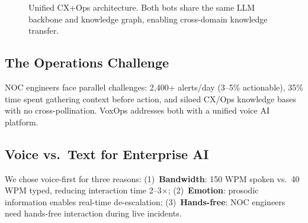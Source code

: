 \documentclass[conference,10pt]{IEEEtran}
\begin{document}
\begin{figure}[!t]
\centering
{}
\caption{Unified CX+Ops architecture. Both bots share the same LLM backbone and knowledge graph, enabling cross-domain knowledge transfer.}
\label{fig:unified}
\end{figure}

\subsection{The Operations Challenge}

NOC engineers face parallel challenges: 2,400+ alerts/day (3--5\% actionable), 35\% time spent gathering context before action, and siloed CX/Ops knowledge bases with no cross-pollination. VoxOps addresses both with a unified voice AI platform.

\subsection{Voice vs.\ Text for Enterprise AI}

We chose voice-first for three reasons: (1)~\textbf{Bandwidth}: 150 WPM spoken vs.\ 40 WPM typed, reducing interaction time 2--3$\times$; (2)~\textbf{Emotion}: prosodic information enables real-time de-escalation; (3)~\textbf{Hands-free}: NOC engineers need hands-free interaction during live incidents.
\end{document}
